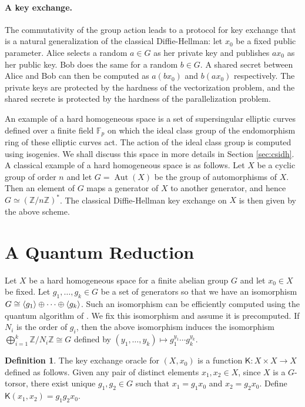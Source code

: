 \documentclass[11pt]{article}
\theoremstyle{plain}
\theoremstyle{definition}
\newtheorem{definition}[theorem]{Definition}
\DeclareMathOperator{\aut}{Aut}
\DeclarePairedDelimiter{\lrang}{\langle}{\rangle}
\def\Z{\mathbb{Z}}
\def\F{\mathbb{F}}
\newcommand{\kex}{\mathsf{K}}
\begin{document}
\paragraph{A key exchange.}
The commutativity of the group action leads to a protocol for key exchange that is a natural 
generalization of the classical Diffie-Hellman: let $x_0$ be a fixed public parameter. Alice selects 
a random $a \in G$ as her private key and publishes $ax_0$ as her public key. Bob does the same for 
a random $b \in G$. A shared secret between Alice and Bob can then be computed as $a(bx_0)$ and 
$b(ax_0)$ respectively. The private keys are protected by the hardness of the vectorization problem, 
and the shared secrete is protected by the hardness of the parallelization problem. 

An example of a hard homogeneous space is a set of supersingular elliptic curves defined over a 
finite field $\F_p$ on which the ideal class group of the endomorphism ring of these elliptic curves 
act. The action of the ideal class group is computed using isogenies. We shall discuss this space in 
more details in Section \ref{sec:csidh}. A classical example of a hard homogeneous space is as 
follows. Let $X$ be a cyclic group of order $n$ and let $G = \aut(X)$ be the group of automorphisms 
of $X$. Then an element of $G$ maps a generator of $X$ to another generator, and hence $G \simeq (\Z 
/ n\Z)^*$. The classical Diffie-Hellman key exchange on $X$ is then given by the above scheme.





\section{A Quantum Reduction}

Let $X$ be a hard homogeneous space for a finite abelian group $G$ and let $x_0 \in X$ be fixed. Let 
$g_1, \dots, g_k \in G$ be a set of generators so that we have an isomorphism $G \cong \lrang{g_1} 
\oplus \cdots \oplus \lrang{g_k}$. Such an isomorphism can be efficiently computed using the quantum
algorithm of \cite{cheung2001decomposing}. We fix this isomorphism and assume it is precomputed. If 
$N_i$ is the order of $g_i$, then the above isomorphism induces the isomorphism $\bigoplus_{i = 1}^k 
\Z / N_i \Z \cong G$ defined by $(y_1, \dots, y_k) \mapsto g_1^{y_1} \cdots g_k^{y_k}$.

\begin{definition}
	The key exchange oracle for $(X, x_0)$ is a function $\kex: X \times X \rightarrow X$ defined as 
	follows. Given any pair of distinct elements $x_1, x_2 \in X$, since $X$ is a $G$-torsor, there 
	exist unique $g_1, g_2 \in G$ such that $x_1 = g_1x_0$ and $x_2 = g_2x_0$. Define $\kex(x_1, x_2) = 
	g_1g_2x_0$.
\end{definition}
\end{document}
